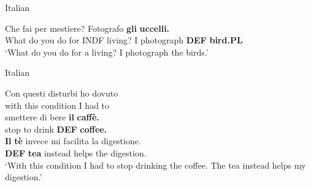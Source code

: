 \z

\item 

Italian



 \ea\label{}
\gll Che  fai  per  mestiere?  Fotografo  \textbf{gli}\textbf{  uccelli.}\\


What do you  do  for  INDF living?  I photograph  \textbf{DEF} \textbf{bird.PL}\\

\glt ‘What do you do for a living? I photograph the birds.’

\z

\item 

Italian



 \ea\label{}
\gll Con  questi  disturbi  ho  dovuto\\


with  this  condition  I  had to\\

 \ea\label{}
\gll smettere  di  bere  \textbf{il} \textbf{caffè.} \\


stop  to  drink  \textbf{DEF} \textbf{coffee.}\\

 \ea\label{}
\gll \textbf{Il} \textbf{tè} invece  mi facilita  la digestione.\\


\textbf{DEF} \textbf{tea} instead  helps  the digestion.\\

\glt ‘With this condition I had to stop drinking the coffee. The tea instead helps my digestion.’

\z

\item 


